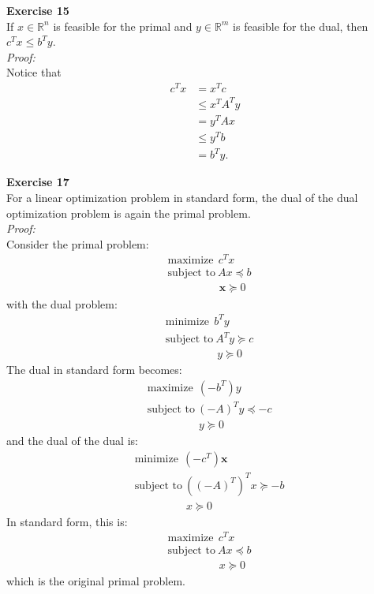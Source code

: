 \documentclass[letterpaper,12pt]{article}
\let\vec\mathbf
\theoremstyle{definition}
\begin{document}
\textbf{Exercise 15} \\
If $x \in \mathbb{R}^n$ is feasible for the primal and $y \in \mathbb{R}^m$ is feasible for the dual, then $c^Tx \leq b^Ty$. \\
\textit{Proof:} \\
Notice that
\begin{align*}
  c^Tx &=x^Tc \\
  &\leq x^TA^Ty \\
  &=y^TAx \\
  &\leq y^Tb \\
  &= b^Ty.
\end{align*}

\textbf{Exercise 17} \\
For a linear optimization problem in standard form, the dual of the dual optimization problem is again the primal problem. \\
\textit{Proof:} \\
Consider the primal problem:
\begin{align*}
  &\text{maximize} \ \ c^Tx \\
  &\text{subject to} \ Ax \preceq b \\
  &\qquad \qquad \ \ \ \vec{x} \succeq 0
\end{align*}
with the dual problem:
\begin{align*}
  &\text{minimize} \ \ b^Ty \\
  &\text{subject to} \ A^Ty \succeq c \\
  &\qquad \qquad \ \ \ y \succeq 0
\end{align*}
The dual in standard form becomes:
\begin{align*}
  &\text{maximize} \ \ (-b^T)y \\
  &\text{subject to} \ (-A)^Ty \preceq -c \\
  &\qquad \qquad \ \ \ y \succeq 0
\end{align*}
and the dual of the dual is:
\begin{align*}
  &\text{minimize} \ \ (-c^T)\vec{x} \\
  &\text{subject to} \ ((-A)^T)^Tx \succeq -b \\
  &\qquad \qquad \ \ \ x \succeq 0
\end{align*}
In standard form, this is:
\begin{align*}
  &\text{maximize} \ \ c^Tx \\
  &\text{subject to} \ Ax \preceq b \\
  &\qquad \qquad \ \ \ x \succeq 0
\end{align*}
which is the original primal problem. \\
\end{document}
